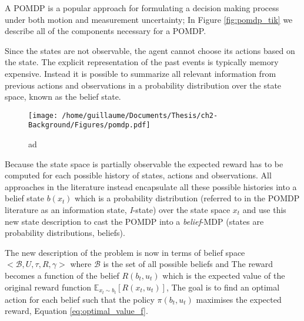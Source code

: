 
A POMDP is a popular approach for formulating a decision making process under both motion and measurement uncertainty;
In Figure \ref{fig:pomdp_tik} we describe all of the components necessary for a POMDP.

Since the states are not observable, the agent cannot choose its actions based on the state. The explicit 
representation of the past events is typically memory expensive. Instead it is possible to summarize all relevant 
information from previous actions and observations in a probability distribution over the state space, known as the
belief state. 

\begin{figure}[h]
 \centering
 \texttt{[image: /home/guillaume/Documents/Thesis/ch2-Background/Figures/pomdp.pdf]}
  \caption{ad}
\end{figure}


Because the state space is partially observable the expected reward has to be computed for each possible history of states, actions and observations.
All approaches in the literature instead encapsulate all these possible histories into a belief state $b(x_t)$ which is a 
probability distribution (referred to in the POMDP literature as an information state, \textit{I}-state) over the state space $x_t$ and use this 
new state description to cast the POMDP into a \textit{belief}-MDP (states are probability distributions, beliefs). 

The new description of the problem is now in terms of belief space $<\mathcal{B},U,\tau,R,\gamma>$ where $\mathcal{B}$ is the set of 
all possible beliefs and 
The reward becomes a function of the belief $R(b_t,u_t)$ which is the expected value of the original reward 
function $\mathbb{E}_{x_t \sim b_t}[R(x_t,u_t)]$, The goal is to find an optimal action for each belief such that 
the policy $\pi(b_t,u_t)$ maximises the expected reward, Equation \ref{eq:optimal_value_f}.

